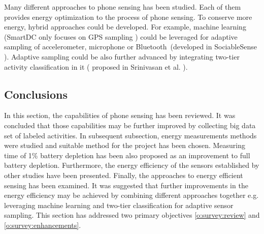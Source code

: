 Many different approaches to phone sensing has been studied. Each of them provides energy optimization to the process of phone sensing. To conserve more energy, hybrid approaches could be developed. For example, machine learning (SmartDC \cite{chon:smartdc} only focuses on GPS sampling ) could be leveraged for adaptive sampling of accelerometer, microphone or Bluetooth\ (developed in SociableSense \cite{rachuri:socialsense}). Adaptive sampling could be also further advanced by integrating two-tier activity classification in it ( proposed in Srinivasan et al. \cite{srinivasan:twotier}). 

\subsection{Conclusions}
\hspace{10pt} In this section, the capabilities of phone sensing has been reviewed. It was concluded that those capabilities may be further improved by collecting big data set of labeled activities. In subsequent subsection, energy measurements methods were studied and suitable method for the project has been chosen. Measuring time of 1\% battery depletion has been also proposed as an improvement to full battery depletion. Furthermore, the energy efficiency of the sensors established by other studies have been presented. Finally, the approaches to energy efficient sensing has been examined. It was suggested that further improvements in the energy efficiency may be achieved by combining different approaches together e.g. leveraging machine learning and two-tier classification for adaptive sensor sampling. This section has addressed two primary objectives \ref{o:survey:review} and \ref{o:survey:enhancements}.